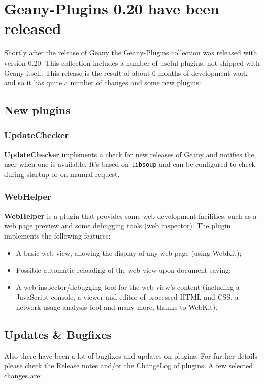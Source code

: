 \documentclass[%
paper=a4,%
fontsize=12pt,%
twoside=false,%
DIV18,
headsepline,
plainheadsepline,
footsepline,
plainfootsepline,
parskip=half,%
openany,%
]{scrartcl}
\begin{document}
\section{Geany-Plugins 0.20 have been released}

Shortly after the release of Geany the Geany-Plugins collection
was released with version 0.20. This collection
includes a number of useful plugins, not shipped with Geany itself.
This release is the result of about 6 months of development work
and so it has quite a number of changes and some new plugins:

\subsection{New plugins}
\subsubsection{UpdateChecker}

\textbf{UpdateChecker} implements a check for new
releases of Geany and notifies the user when one is
available. It's based on \texttt{libsoup} and can be configured to check
during startup or on manual request.

\subsubsection{WebHelper}

\textbf{WebHelper} is a plugin that provides some web
development facilities, such as a web page preview and some
debugging tools (web inspector). The plugin implements
the following features:

\begin{itemize}
	\item A basic web view, allowing the display of any web page (using WebKit);
	\item Possible automatic reloading of the web view upon document saving;
	\item A web inspector/debugging tool for the web view's content (including a
		JavaScript console, a viewer and editor of processed HTML and CSS, a network
		usage analysis tool and many more, thanks to WebKit).
\end{itemize}

\subsection{Updates \& Bugfixes}

Also there have been a lot of bugfixes and updates on plugins. For
further details please check the Release notes and/or the ChangeLog
of plugins. A few selected changes are:
\end{document}

